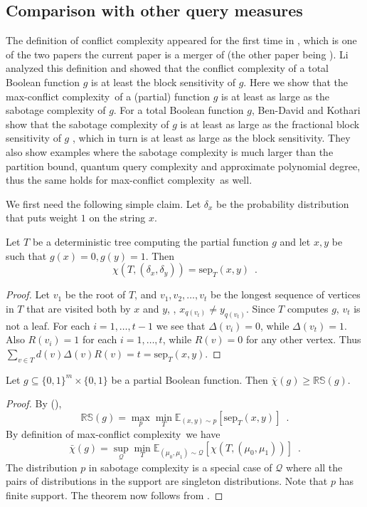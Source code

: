 \documentclass{toc}
\newcommand{\clQ}{\mathcal{Q}}
\newcommand{\RS}{\mathbb{RS}}
\newcommand{\sep}{\mathrm{sep}}
\newcommand{\E}{\mathbb{E}}
\newcommand{\ccc}{max-conflict complexity}
\begin{document}
\subsection{Comparison with other query measures}
The definition of conflict complexity appeared for the first time in \cite{DBLP:journals/corr/abs-1801-03285}, which is one of the two papers the current paper is a merger of (the other paper being \cite{DBLP:journals/corr/abs-1801-02226}). Li \cite{Li18} analyzed this definition and showed that the conflict complexity of a total Boolean function $g$ is at least the block sensitivity of $g$. Here we show 
that the \ccc \ of a (partial) function $g$ is at least as large as the sabotage complexity of $g$.  For a total Boolean function $g$, Ben-David 
and Kothari \cite{DBLP:conf/icalp/Ben-DavidK16} show that the sabotage complexity of $g$ is at least as large as the fractional block sensitivity of $g$ \cite{Aar08, Tal13, GSS16}, 
which in turn is at least as large as the block sensitivity.  They also show examples where the sabotage complexity is much larger than the partition bound, quantum query complexity 
and approximate polynomial degree, thus the same holds for \ccc \ as well.  

We first need the following simple claim.  Let $\delta_x$ be the probability distribution that puts weight $1$ on the string $x$.
\begin{claim}
\label{clm:sabotage}
Let $T$ be a deterministic tree computing the partial function $g$ and let $x,y$ be such that $g(x) = 0, g(y) =1$.  Then 
\[
\chi(T, (\delta_x, \delta_y)) = \sep_T(x,y) \enspace .
\]
\end{claim}

\begin{proof}
Let $v_1$ be the root of $T$, and $v_1, v_2, \ldots, v_t$ be the longest sequence of vertices in $T$ that are visited both by $x$ and $y$, \ie, 
$x_{q(v_t)} \ne y_{q(v_t)}$.  Since $T$ computes $g$, $v_t$ is not a leaf. For each $i=1, \ldots, t-1$ we see that $\Delta(v_i) = 0$, while $\Delta(v_t)=1$.  Also $R(v_i)=1$ for each $i=1, \ldots, t$, 
while $R(v)=0$ for any other vertex.  Thus $\sum_{v \in T} d(v) \Delta(v) R(v) = t = \sep_T(x,y)$.  
\end{proof}

\begin{theorem}
Let $g \subseteq \{0,1\}^m \times \{0,1\}$ be a partial
%
Boolean function.  Then $\bar \chi(g) \ge \RS(g)$.  
\end{theorem}

\begin{proof}
By  (), 
\[
\RS(g) = \max_p \min_T \E_{(x,y) \sim p} [\sep_T(x,y)] \enspace .
\]
By definition of \ccc \ we have
\[
\bar \chi(g) = \sup_{\clQ} \min_T \E_{(\mu_0, \mu_1) \sim \clQ} [\chi(T, (\mu_0, \mu_1))] \enspace .
\]
The distribution $p$ in sabotage complexity is a special case of $\clQ$ where all the pairs of distributions in the support are 
singleton distributions.  Note that $p$ has finite support. The theorem now follows from .
\end{proof}
%
\end{document}
